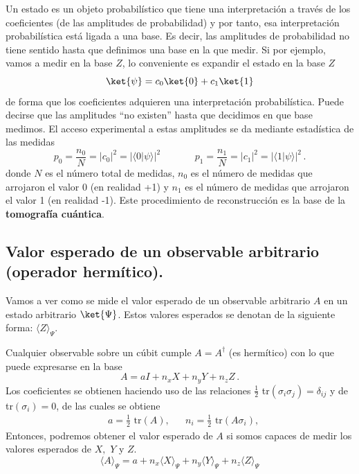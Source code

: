 \documentclass[a4paper,11pt]{book} %
\numberwithin{equation}{chapter}
\newcommand{\braket}[2]{\langle #1|#2\rangle}
\begin{document}
    
Un estado es un objeto probabilístico que tiene una interpretación a través de los coeficientes (de las amplitudes de probabilidad) y por tanto, esa interpretación probabilística está ligada a una base. Es decir, las amplitudes de probabilidad no tiene sentido hasta que definimos una base en la que medir. Si por ejemplo, vamos a medir en la base $Z$, lo conveniente es expandir el estado en la base $Z$
$$
\ket{\psi} = c_0 \ket{0} + c_1 \ket{1}
$$
de forma que los coeficientes adquieren una interpretación probabilística. Puede decirse que las amplitudes ``no existen'' hasta que decidimos en que base medimos. El acceso experimental a estas amplitudes se da mediante estadística de las medidas
\begin{equation}
\boxed{p_0 = \frac{n_{0}}{N} = |c_0|^2 = |\braket{0}{\psi}|^2} ~~~~~~~~~~~~~~~~ \boxed{p_1 = \frac{n_{1}}{N}=|c_1|^2 =  |\braket{1}{\psi}|^2} \, .
\end{equation}
donde $N$ es el número total de medidas, $n_0$ es el número de medidas que arrojaron el valor 0 (en realidad +1) y $n_1$ es el número de medidas que arrojaron el valor 1 (en realidad -1).
Este procedimiento de reconstrucción es la base de la \textbf{tomografía cuántica}.



	    \subsection{Valor esperado de un observable arbitrario (operador hermítico). }
	    
Vamos a ver como se mide el valor esperado de un observable arbitrario $A$ en un estado arbitrario $\ket{\Psi}$. Estos valores esperados se denotan de la siguiente forma: $\langle Z \rangle_\Psi$. 

Cualquier observable sobre un cúbit cumple $A = A^\dagger$ (es hermítico) con lo que puede expresarse en la base
	\begin{equation} \label{ec_medidas1_expansion_A_en_Paulis}
	A = a I + n_x X + n_y Y  + n_z Z \, .
	\end{equation}
Los coeficientes se obtienen haciendo uso de las relaciones $\frac{1}{2}$ tr$ (\sigma_i \sigma_j) = \delta_{ij}$ y de tr$(\sigma_i)=0$, de las cuales se obtiene
	\begin{align}
	&\boxed{a  = \frac{1}{2} \text{ tr}(A)},        &         &\boxed{n_i = \frac{1}{2} \text{ tr}  (A \sigma_i)},
	\end{align} 
Entonces, podremos obtener el valor esperado de $A$  si somos capaces de medir los valores esperados de $X,$ $Y$ y $Z$.
	\begin{equation}
	\boxed{\langle A\rangle_\Psi = a + n_x \langle X\rangle_\Psi + n_y \langle Y\rangle_\Psi + n_z \langle Z\rangle_\Psi}
	\end{equation}
\end{document}
